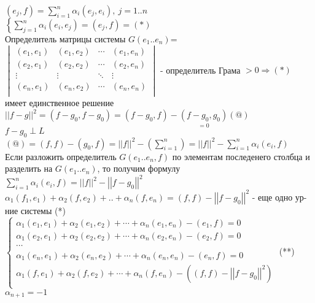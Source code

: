 $(e_j,f)=\sum \limits_{i=1}^n {\alpha_i (e_j,e_i)}, \ j=1..n $ \\
$\left\{\sum \limits_{j=1}^n {\alpha_i(e_i,e_j)=(e_j,f)}\right. = (*)$ \\
Определитель матрицы системы $G(e_1..e_n)$=
$\begin{vmatrix}
         (e_1,e_1) & (e_1,e_2) & \cdots & (e_1,e_n) \\
         (e_2,e_1) & (e_2,e_2) & \cdots & (e_2,e_n) \\
         \vdots & \vdots & \ddots & \vdots \\
         (e_n,e_1) & (e_n,e_2) & \cdots & (e_n,e_n) \\
\end{vmatrix}$ - определитель Грама $>0 \Rightarrow(*)$ имеет единственное решение \\
$\left| \left| f-g \right| \right|^2 = (f-g_0,f-g_0) = (f-g_0,f) - \underset{=0}{(f-g_0,g_0)} (@) $ \\
$f-g_0 \perp L$ \\
$(@)=(f,f)-(g_0,f) = \left| \left| f \right| \right|^2 - (\sum \limits_{i=1}^n) = \left| \left| f \right| \right|^2 - \sum \limits_{i=1}^n {\alpha_i(e_i,f)} $ \\
Если разложить определитель $G(e_1..e_n,f)$ по элементам последенего столбца и разделить на $G(e_1..e_n)$, то получим формулу \\
$\sum \limits_{i=1}^n {\alpha_i(e_i,f)} = \left| \left| f \right| \right|^2 - \left| \left|  f-g_0 \right| \right|^2 $ \\
$\alpha_1(f_1,e_1)+\alpha_2(f,e_2)+..+\alpha_n(f,e_n)=(f,f) - \left| \left| f-g_0 \right| \right|^2$ - еще одно ур-ние системы (*) \\
$\left\{ \begin{matrix}
\mbox{$\alpha_1 (e_1,e_1) + \alpha_2 (e_1,e_2)+ \cdots +\alpha_n (e_1,e_n) - (e_1,f)$}=0 \\
\mbox{$\alpha_1 (e_2,e_1) + \alpha_2 (e_2,e_2)+ \cdots +\alpha_n (e_2,e_n) - (e_2,f)$}=0 \\
\mbox{$\cdots $} \\
\mbox{$\alpha_1 (e_n,e_1) + \alpha_2 (e_n,e_2)+ \cdots +\alpha_n (e_n,e_n) - (e_n,f)$}=0 \\
\mbox{$\alpha_1 (f,e_1) + \alpha_2 (f,e_2)+ \cdots +\alpha_n (f,e_n) - \left( (f,f) - \left| \left|  f-g_0 \right| \right|^2 \right) $} \\
\end{matrix}\right.$ (**) \\
$\alpha_{n+1}=-1$ \\
